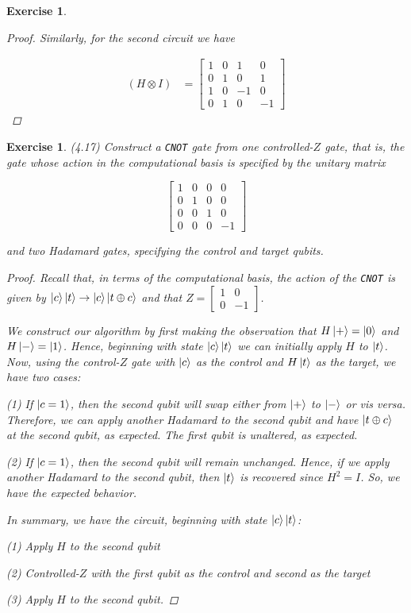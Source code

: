 \documentclass[11pt]{article}
\newcommand\0{\mathbf{0}}
\newcommand\<{\langle}
\renewcommand\>{\rangle}
\newtheorem{exercise}[theorem]{Exercise}
\begin{document}
\begin{exercise}
\begin{proof}
Similarly, for the second circuit we have

\begin{align*}
	(H \otimes I) &= \begin{bmatrix}	
	1 & 0 & 1 & 0 \\
	0 & 1 & 0 & 1 \\
	1 & 0 & -1 & 0 \\
	0 & 1 & 0 & -1
 \end{bmatrix}
\end{align*}
\end{proof}	
\end{exercise}

\begin{exercise} (4.17)
Construct a \texttt{CNOT} gate from one controlled-$Z$ gate, that is, the gate whose action in the computational basis is specified by the unitary matrix

$$
\begin{bmatrix}
1 & 0 & 0 & 0 \\
0 & 1 & 0 & 0 \\
0 & 0 & 1 & 0 \\
0 & 0 & 0 & -1		
\end{bmatrix}
$$

and two Hadamard gates, specifying the control and target qubits.

\begin{proof}
Recall that, in terms of the computational basis, the action of the \texttt{CNOT} is given by $\ket{c}\ket{t} \rightarrow \ket{c} \ket{t \oplus c}$ and that $Z = \begin{bmatrix} 1 & 0 \\ 0 & -1 \end{bmatrix}$.

We construct our algorithm by first making the observation that $H\ket{+} = \ket{0}$ and $H\ket{-} = \ket{1}$. Hence, beginning with state $\ket{c}\ket{t}$ we can initially apply $H$ to $\ket{t}$. Now, using the control-$Z$ gate with $\ket{c}$ as the control and $H\ket{t}$ as the target, we have two cases: 

(1) If $\ket{c = 1}$, then the second qubit will swap either from $\ket{+}$ to $\ket{-}$ or vis versa. Therefore, we can apply another Hadamard to the second qubit and have $\ket{t \oplus c}$ at the second qubit, as expected. The first qubit is unaltered, as expected.

(2) If $\ket{c = 1}$, then the second qubit will remain unchanged. Hence, if we apply another Hadamard to the second qubit, then $\ket{t}$ is recovered since $H^2 = I$. So, we have the expected behavior. 

In summary, we have the circuit, beginning with state $\ket{c}\ket{t}$:

(1) Apply $H$ to the second qubit

(2) Controlled-$Z$ with the first qubit as the control and second as the target 

(3) Apply $H$ to the second qubit. 
\end{proof}
\end{exercise}
\end{document}
